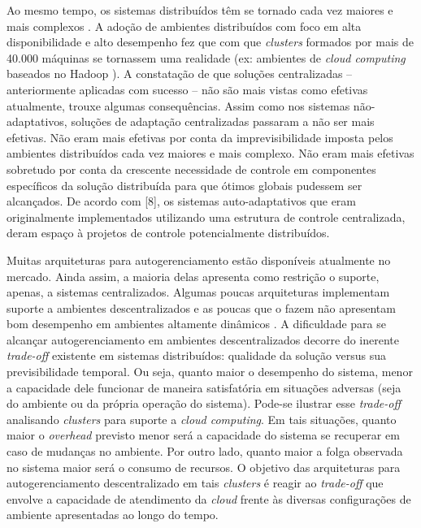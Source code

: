 \documentclass[conference]{IEEEtran}
\begin{document}
Ao mesmo tempo, os sistemas distribuídos têm se tornado cada vez maiores e mais complexos \cite{DBLP:conf/icse/Northrop13}. A adoção de ambientes distribuídos com foco em alta disponibilidade e alto desempenho fez que com que \textit{clusters} formados por mais de 40.000 máquinas se tornassem uma realidade (ex: ambientes de \textit{cloud computing} baseados no Hadoop \cite{white2009hadoop}). A constatação de que soluções centralizadas -- anteriormente aplicadas com sucesso -- não são mais vistas como efetivas atualmente, trouxe algumas consequências. Assim como nos sistemas não-adaptativos, soluções de adaptação centralizadas passaram a não ser mais efetivas. Não eram mais efetivas por conta da imprevisibilidade imposta pelos ambientes distribuídos cada vez maiores e mais complexo. Não eram mais efetivas sobretudo por conta da crescente necessidade de controle em componentes específicos da solução distribuída para que ótimos globais pudessem ser alcançados. De acordo com [8], os sistemas auto-adaptativos que eram originalmente implementados utilizando uma estrutura de controle centralizada, deram espaço à projetos de controle potencialmente distribuídos.

Muitas arquiteturas para autogerenciamento estão disponíveis atualmente no mercado. Ainda assim, a maioria delas apresenta como restrição o suporte, apenas, a sistemas centralizados. Algumas poucas arquiteturas implementam suporte a ambientes descentralizados e as poucas que o fazem não apresentam bom desempenho em ambientes altamente dinâmicos \cite{DBLP:conf/dagstuhl/WeynsSGMMPWAGG10}. A dificuldade para se alcançar autogerenciamento em ambientes descentralizados decorre do inerente \textit{trade-off} existente em sistemas distribuídos: qualidade da solução versus sua previsibilidade temporal. Ou seja, quanto maior o desempenho do sistema, menor a capacidade dele funcionar de maneira satisfatória em situações adversas (seja do ambiente ou da própria operação do sistema). Pode-se ilustrar esse \textit{trade-off} analisando \textit{clusters} para suporte a \textit{cloud computing}. Em tais situações, quanto maior o \textit{overhead} previsto menor será a capacidade do sistema se recuperar em caso de mudanças no ambiente. Por outro lado, quanto maior a folga observada no sistema maior será o consumo de recursos. O objetivo das arquiteturas para autogerenciamento descentralizado em tais \textit{clusters} é reagir ao \textit{trade-off} que envolve a capacidade de atendimento da \textit{cloud} frente às diversas configurações de ambiente apresentadas ao longo do tempo.
\end{document}
